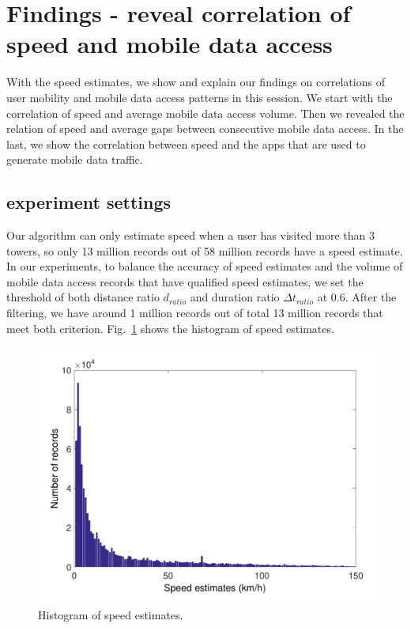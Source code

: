 \section{Findings - reveal correlation of speed and mobile data access}

With the speed estimates, we show and explain our findings on correlations of user mobility and mobile data access patterns in this session. We start with the correlation of speed and average mobile data access volume. Then we revealed the relation of speed and average gaps between consecutive mobile data access. In the last, we show the correlation between speed and the apps that are used to generate mobile data traffic.

\subsection{experiment settings}

Our algorithm can only estimate speed when a user has visited more than 3 towers, so only 13 million records out of 58 million records have a speed estimate. In our experiments, to balance the accuracy of speed estimates and the volume of mobile data access records that have qualified speed estimates, we set the threshold of both distance ratio $d_{ratio}$ and duration ratio $\Delta t_{ratio}$ at 0.6. After the filtering, we have around 1 million records out of total 13 million records that meet both criterion. Fig.~\ref{fig:speed_hist} shows the histogram of speed estimates.

\begin{figure}[h]
    \centering
    \includegraphics[width=\linewidth]{./figures/speed_hist.pdf}
    \caption{Histogram of speed estimates.}
    \label{fig:speed_hist}
\end{figure}

